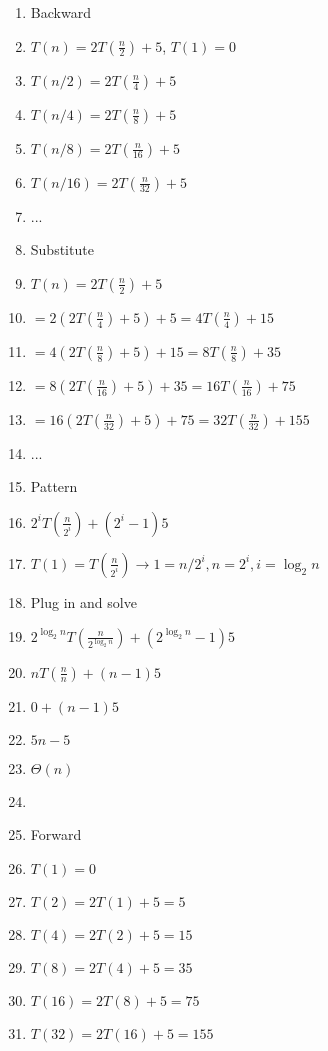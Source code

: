 \documentclass{article}
\begin{document}
\begin{itemize}
\begin{enumerate}
        \item[] Backward
        \item[] $T(n) = 2T(\frac{n}{2}) + 5$, $T(1) = 0$
        \item[] $T(n/2) = 2T(\frac{n}{4}) + 5$
        \item[] $T(n/4) = 2T(\frac{n}{8}) + 5$
        \item[] $T(n/8) = 2T(\frac{n}{16}) + 5$
        \item[] $T(n/16) = 2T(\frac{n}{32}) + 5$
        \item[] ...
        \item[] Substitute
        \item[] $T(n) = 2T(\frac{n}{2}) + 5$
        \item[] $= 2(2T(\frac{n}{4}) + 5) + 5 = 4T(\frac{n}{4}) + 15$
        \item[] $= 4(2T(\frac{n}{8}) + 5) + 15 = 8T(\frac{n}{8}) + 35$
        \item[] $= 8(2T(\frac{n}{16}) + 5) + 35 = 16T(\frac{n}{16}) + 75$
        \item[] $= 16(2T(\frac{n}{32}) + 5) + 75 = 32T(\frac{n}{32}) + 155$
        \item[] ...
        \item[] Pattern
        \item[] $2^i T(\frac{n}{2^i}) + ( 2^i - 1 )5$
        \item[] $T(1) = T(\frac{n}{2^i}) \rightarrow 1 = n/2^i, n = 2^i, i = \log_2n$
        \item[] Plug in and solve
        \item[] $2^{ \log_2n } T(\frac{n}{2^{ \log_2n }}) + ( 2^{ \log_2n } - 1 )5$
        \item[] $n T(\frac{n}{n}) + ( n - 1 )5$
        \item[] $0 + ( n - 1 )5$
        \item[] $5n - 5$
        \item[] $\Theta (n)$
        \item[]
        \item[] Forward
        \item[] $T(1) = 0$
        \item[] $T(2) = 2T(1) + 5 = 5$
        \item[] $T(4) = 2T(2) + 5 = 15$
        \item[] $T(8) = 2T(4) + 5 = 35$
        \item[] $T(16) = 2T(8) + 5 = 75$
        \item[] $T(32) = 2T(16) + 5 = 155$

\end{enumerate}
\end{itemize}
\end{document}
